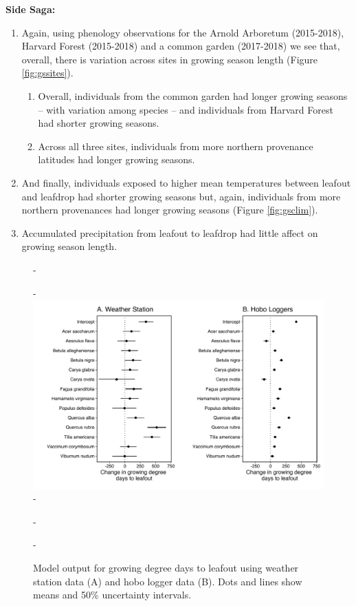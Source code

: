 \documentclass{article}\usepackage[]{graphicx}\usepackage[]{color}
\begin{document}
{\large{\textbf{Side Saga:}}
\begin{enumerate}
\item Again, using phenology observations for the Arnold Arboretum (2015-2018), Harvard Forest (2015-2018) and a common garden (2017-2018) we see that, overall, there is variation across sites in growing season length (Figure \ref{fig:gssites}). 
  \begin{enumerate}
  \item Overall, individuals from the common garden had longer growing seasons -- with variation among species -- and individuals from Harvard Forest had shorter growing seasons.
  \item Across all three sites, individuals from more northern provenance latitudes had longer growing seasons. 
  \end{enumerate}
\item And finally, individuals exposed to higher mean temperatures between leafout and leafdrop had shorter growing seasons but, again, individuals from more northern provenances had longer growing seasons (Figure \ref{fig:gsclim}). 
\item Accumulated precipitation from leafout to leafdrop had little affect on growing season length.
\end{enumerate}

{\begin{figure} [H]
  -\begin{center}
  -\includegraphics[width=16cm]{..//analyses/figures/muplot_compare_lo.pdf}
  -\caption{Model output for growing degree days to leafout using weather station data (A) and hobo logger data (B). Dots and lines show means and 50\% uncertainty intervals.}\label{fig:compare}
  -\end{center}
  -\end{figure}}
  
}
\end{document}
